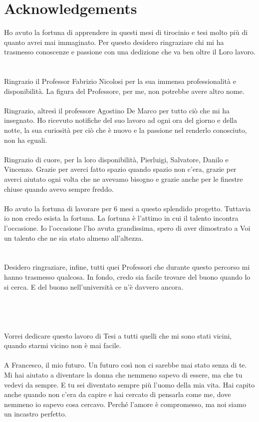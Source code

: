 \chapter{Acknowledgements}

Ho avuto la fortuna di apprendere in questi mesi di tirocinio e tesi molto più di quanto avrei mai immaginato.  Per questo desidero ringraziare chi mi ha trasmesso conoscenze e passione con una dedizione che va ben oltre il Loro lavoro. \\\\\\
Ringrazio il Professor Fabrizio Nicolosi per la sua immensa professionalità e disponibilità. La figura del Professore, per me, non potrebbe avere altro nome.\\\\
Ringrazio, altresì il professore Agostino De Marco per tutto ciò che mi ha insegnato. Ho ricevuto notifiche del suo lavoro ad ogni ora del giorno e della notte, la sua curiosità per ciò che è nuovo e la passione nel renderlo conosciuto, non ha eguali.\\\\
Ringrazio di cuore, per la loro disponibilità, Pierluigi, Salvatore, Danilo e Vincenzo. Grazie per averci fatto spazio quando spazio non c’era,  grazie per averci aiutato ogni volta che ne avevamo bisogno e grazie anche per le finestre chiuse quando avevo sempre freddo.\\\\
Ho avuto la fortuna di lavorare per 6 mesi a questo splendido progetto. Tuttavia io non credo esista la fortuna. La fortuna è l’attimo in cui il talento incontra l’occasione. Io l’occasione l'ho avuta grandissima, spero di aver dimostrato a Voi un talento che ne sia stato almeno all’altezza.\\\\\\
Desidero ringraziare, infine, tutti quei Professori che durante questo percorso mi hanno trasmesso qualcosa. In fondo, credo sia facile trovare del buono quando lo si cerca. E del buono nell’università ce n’è davvero ancora.
\\\\\\\\\\
Vorrei dedicare questo lavoro di Tesi a tutti quelli che mi sono stati vicini, quando starmi vicino non è mai facile.\\\\
A Francesco, il mio futuro. Un futuro così non ci sarebbe mai stato senza di te. Mi hai aiutato a diventare la donna che nemmeno sapevo di essere, ma che tu vedevi da sempre. E tu sei diventato sempre più l'uomo della mia vita. Hai capito anche quando non c’era da capire e hai cercato di pensarla come me, dove nemmeno io sapevo cosa cercavo. Perché l'amore è compromesso, ma noi siamo un incastro perfetto.\\\\
